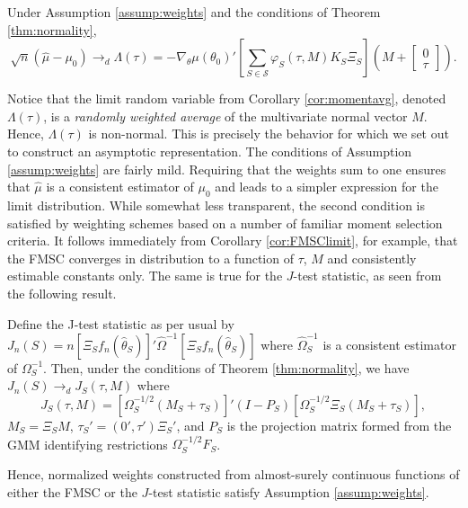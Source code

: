 \begin{cor}
\label{cor:momentavg}
Under Assumption \ref{assump:weights} and the conditions of Theorem \ref{thm:normality},
	$$\sqrt{n}\left(\widehat{\mu} -  \mu_0\right) \rightarrow_{d}\Lambda(\tau) =  -\nabla_\theta\mu(\theta_0)'\left[\sum_{S \in \mathscr{S}} \varphi_S(\tau,M) K_S\Xi_S\right] \left(M + \left[\begin{array}
	{c} 0 \\ \tau
\end{array} \right]\right).$$
\end{cor}
Notice that the limit random variable from Corollary \ref{cor:momentavg}, denoted $\Lambda(\tau)$, is a \emph{randomly weighted average} of the multivariate normal vector $M$. 
Hence, $\Lambda(\tau)$ is non-normal. 
This is precisely the behavior for which we set out to construct an asymptotic representation.
The conditions of Assumption \ref{assump:weights} are fairly mild. 
Requiring that the weights sum to one ensures that $\widehat{\mu}$ is a consistent estimator of $\mu_0$ and leads to a simpler expression for the limit distribution. 
While somewhat less transparent, the second condition is satisfied by weighting schemes based on a number of familiar moment selection criteria.
It follows immediately from Corollary \ref{cor:FMSClimit}, for example, that the FMSC converges in distribution to a function of $\tau$, $M$ and consistently estimable constants only. 
The same is true for the $J$-test statistic, as seen from the following result.
\begin{thm} 
\label{pro:jstat}
	Define the J-test statistic as per usual by $J_n(S)  = n \left[\Xi_S f_n(\widehat{\theta}_S)\right]' \widehat{\Omega}^{-1}\left[\Xi_S f_n(\widehat{\theta}_S)\right]$ where $\widehat{\Omega}^{-1}_S$ is a consistent estimator of $\Omega_S^{-1}$. Then, under the conditions of Theorem \ref{thm:normality}, we have $J_n(S) \rightarrow_dJ_S(\tau, M)$ where
		$$J_S(\tau, M)=[\Omega_S^{-1/2}(M_S + \tau_S)]' (I - P_S)[\Omega_S^{-1/2}\Xi_S(M_S + \tau_S)],$$
$M_S = \Xi_S M$, $\tau_S' = (0', \tau')\Xi_S'$, and $P_S$ is the projection matrix formed from the GMM identifying restrictions $\Omega^{-1/2}_S F_S$.
\end{thm}
Hence, normalized weights constructed from almost-surely continuous functions of either the FMSC or the $J$-test statistic satisfy Assumption \ref{assump:weights}. 

